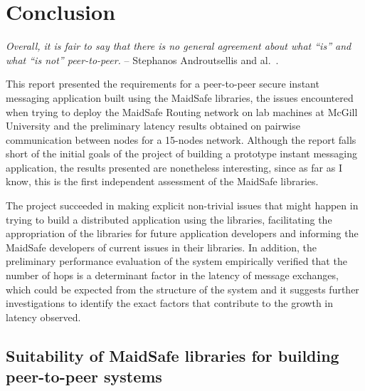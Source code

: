 \chapter{Conclusion}

\textit{Overall, it is fair to say that there is no general agreement about what “is” and what “is not” peer-to-peer.} -- Stephanos Androutsellis and al.~\cite{Androutsellis-Theotokis:2004}.



This report presented the requirements for a peer-to-peer secure instant messaging application built using the MaidSafe libraries, the issues encountered when trying to deploy the MaidSafe Routing network on lab machines at McGill University and the preliminary latency results obtained on pairwise communication between nodes for a 15-nodes network. Although the report falls short of the initial goals of the project of building a prototype instant messaging application, the results presented are nonetheless interesting, since as far as I know, this is the first independent assessment of the MaidSafe libraries.  

The project succeeded in making explicit non-trivial issues that might happen in trying to build a distributed application using the libraries, facilitating the appropriation of the libraries for future application developers and informing the MaidSafe developers of current issues in their libraries. In addition, the preliminary performance evaluation of the system empirically verified that the number of hops is a determinant factor in the latency of message exchanges, which could be expected from the structure of the system and it suggests further investigations to identify the exact factors that contribute to the growth in latency observed.

\section{Suitability of MaidSafe libraries for building peer-to-peer systems}

